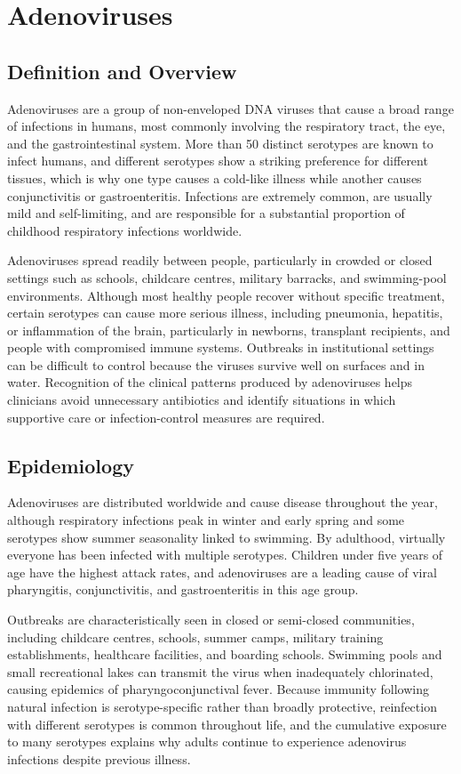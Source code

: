 \chapter{Adenoviruses}

\section*{Definition and Overview}
Adenoviruses are a group of non-enveloped DNA viruses that cause a broad range of infections in humans, most commonly involving the respiratory tract, the eye, and the gastrointestinal system. More than 50 distinct serotypes are known to infect humans, and different serotypes show a striking preference for different tissues, which is why one type causes a cold-like illness while another causes conjunctivitis or gastroenteritis. Infections are extremely common, are usually mild and self-limiting, and are responsible for a substantial proportion of childhood respiratory infections worldwide.

Adenoviruses spread readily between people, particularly in crowded or closed settings such as schools, childcare centres, military barracks, and swimming-pool environments. Although most healthy people recover without specific treatment, certain serotypes can cause more serious illness, including pneumonia, hepatitis, or inflammation of the brain, particularly in newborns, transplant recipients, and people with compromised immune systems. Outbreaks in institutional settings can be difficult to control because the viruses survive well on surfaces and in water. Recognition of the clinical patterns produced by adenoviruses helps clinicians avoid unnecessary antibiotics and identify situations in which supportive care or infection-control measures are required.

\section*{Epidemiology}
Adenoviruses are distributed worldwide and cause disease throughout the year, although respiratory infections peak in winter and early spring and some serotypes show summer seasonality linked to swimming. By adulthood, virtually everyone has been infected with multiple serotypes. Children under five years of age have the highest attack rates, and adenoviruses are a leading cause of viral pharyngitis, conjunctivitis, and gastroenteritis in this age group.

Outbreaks are characteristically seen in closed or semi-closed communities, including childcare centres, schools, summer camps, military training establishments, healthcare facilities, and boarding schools. Swimming pools and small recreational lakes can transmit the virus when inadequately chlorinated, causing epidemics of pharyngoconjunctival fever. Because immunity following natural infection is serotype-specific rather than broadly protective, reinfection with different serotypes is common throughout life, and the cumulative exposure to many serotypes explains why adults continue to experience adenovirus infections despite previous illness.

